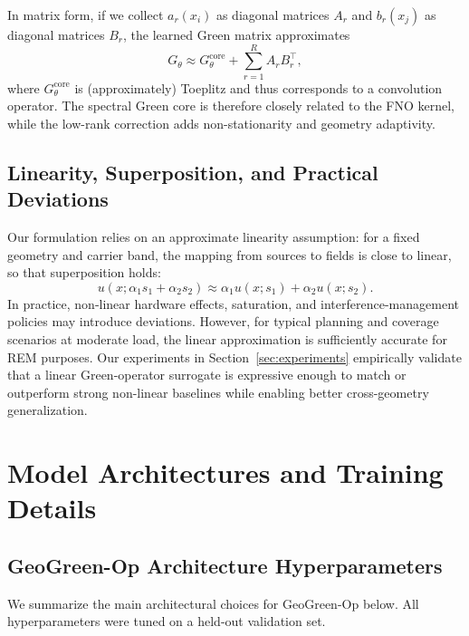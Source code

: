 \documentclass{article}
\begin{document}
In matrix form, if we collect
$a_r(x_i)$ as diagonal matrices $A_r$ and $b_r(x_j)$ as diagonal
matrices $B_r$, the learned Green matrix approximates
\begin{equation}
G_\theta
\approx G^{\text{core}}_\theta + \sum_{r=1}^R A_r B_r^\top,
\end{equation}
where $G^{\text{core}}_\theta$ is (approximately) Toeplitz and
thus corresponds to a convolution operator.
The spectral Green core is therefore closely related to the FNO kernel,
while the low-rank correction adds non-stationarity and
geometry adaptivity.

\subsection{Linearity, Superposition, and Practical Deviations}

Our formulation relies on an approximate linearity assumption:
for a fixed geometry and carrier band,
the mapping from sources to fields is close to linear, so that
superposition holds:
\begin{equation}
u(x; \alpha_1 s_1 + \alpha_2 s_2)
\approx \alpha_1 u(x; s_1) + \alpha_2 u(x; s_2).
\end{equation}
In practice, non-linear hardware effects, saturation,
and interference-management policies may introduce deviations.
However, for typical planning and coverage scenarios at moderate load,
the linear approximation is sufficiently accurate for REM purposes.
Our experiments in Section~\ref{sec:experiments} empirically validate
that a linear Green-operator surrogate is expressive enough to
match or outperform strong non-linear baselines while enabling
better cross-geometry generalization.


\section{Model Architectures and Training Details}
\label{app:training_details}

\subsection{GeoGreen-Op Architecture Hyperparameters}

We summarize the main architectural choices for GeoGreen-Op below.
All hyperparameters were tuned on a held-out validation set.
\end{document}
